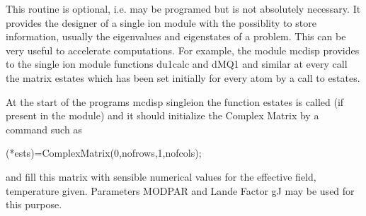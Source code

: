 This routine is optional, i.e. may be programed but is not absolutely necessary. It provides the designer of a %
single ion module
with the possiblity to store information, usually the eigenvalues and eigenstates of a problem. This can be very %
useful to accelerate computations. 
For example, the module {\prg mcdisp} provides to the single ion module functions
 {\prg du1calc} and {\prg dMQ1} and similar
at every call the matrix {\prg estates} which has been set initially for every atom
by a call to {\prg estates}.

At the start of the programs {\prg mcdisp} {\prg singleion} the function {\prg estates}
is called (if present in the module) and it should initialize the Complex Matrix by a command such as

{\prg (*ests)=ComplexMatrix(0,nofrows,1,nofcols);} 

and fill this matrix with sensible numerical values for the effective field, temperature given.
Parameters {\prg MODPAR} and Lande Factor {\prg gJ} may be used for this purpose. 

